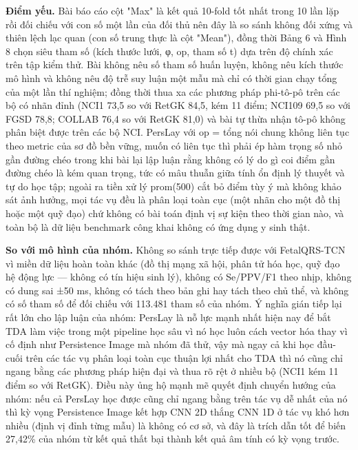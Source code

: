 \documentclass[12pt,a4paper]{article}
\begin{document}
\noindent \textbf{Điểm yếu.} Bài báo cáo cột "Max" là kết quả 10-fold tốt nhất trong 10 lần lặp rồi đối chiếu với con số một lần của đối thủ nên đây là so sánh không đối xứng và thiên lệch lạc quan (con số trung thực là cột "Mean"), đồng thời Bảng 6 và Hình 8 chọn siêu tham số (kích thước lưới, φ, op, tham số t) dựa trên độ chính xác trên tập kiểm thử. Bài không nêu số tham số huấn luyện, không nêu kích thước mô hình và không nêu độ trễ suy luận một mẫu mà chỉ có thời gian chạy tổng của một lần thí nghiệm; đồng thời thua xa các phương pháp phi-tô-pô trên các bộ có nhãn đỉnh (NCI1 73,5 so với RetGK 84,5, kém 11 điểm; NCI109 69,5 so với FGSD 78,8; COLLAB 76,4 so với RetGK 81,0) và bài tự thừa nhận tô-pô không phân biệt được trên các bộ NCI. PersLay với op = tổng nói chung không liên tục theo metric của sơ đồ bền vững, muốn có liên tục thì phải ép hàm trọng số nhỏ gần đường chéo trong khi bài lại lập luận rằng không có lý do gì coi điểm gần đường chéo là kém quan trọng, tức có mâu thuẫn giữa tính ổn định lý thuyết và tự do học tập; ngoài ra tiền xử lý prom(500) cắt bỏ điểm tùy ý mà không khảo sát ảnh hưởng, mọi tác vụ đều là phân loại toàn cục (một nhãn cho một đồ thị hoặc một quỹ đạo) chứ không có bài toán định vị sự kiện theo thời gian nào, và toàn bộ là dữ liệu benchmark công khai không có ứng dụng y sinh thật.\par\vspace{3pt}
\noindent \textbf{\color{tdtblue}So với mô hình của nhóm.} Không so sánh trực tiếp được với FetalQRS-TCN vì miền dữ liệu hoàn toàn khác (đồ thị mạng xã hội, phân tử hóa học, quỹ đạo hệ động lực — không có tín hiệu sinh lý), không có Se/PPV/F1 theo nhịp, không có dung sai ±50 ms, không có tách theo bản ghi hay tách theo chủ thể, và không có số tham số để đối chiếu với 113.481 tham số của nhóm. Ý nghĩa gián tiếp lại rất lớn cho lập luận của nhóm: PersLay là nỗ lực mạnh nhất hiện nay để bắt TDA làm việc trong một pipeline học sâu vì nó học luôn cách vector hóa thay vì cố định như Persistence Image mà nhóm đã thử, vậy mà ngay cả khi học đầu-cuối trên các tác vụ phân loại toàn cục thuận lợi nhất cho TDA thì nó cũng chỉ ngang bằng các phương pháp hiện đại và thua rõ rệt ở nhiều bộ (NCI1 kém 11 điểm so với RetGK). Điều này ủng hộ mạnh mẽ quyết định chuyển hướng của nhóm: nếu cả PersLay học được cũng chỉ ngang bằng trên tác vụ dễ nhất của nó thì kỳ vọng Persistence Image kết hợp CNN 2D thắng CNN 1D ở tác vụ khó hơn nhiều (định vị đỉnh từng mẫu) là không có cơ sở, và đây là trích dẫn tốt để biến 27,42\% của nhóm từ kết quả thất bại thành kết quả âm tính có kỳ vọng trước.\par\vspace{3pt}
\end{document}
